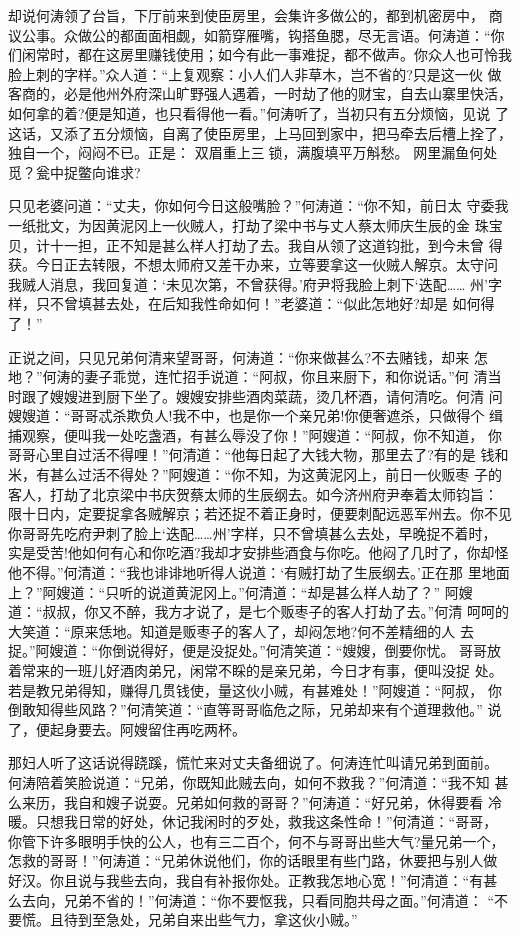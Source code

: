 却说何涛领了台旨，下厅前来到使臣房里，会集许多做公的，都到机密房中，
商议公事。众做公的都面面相觑，如箭穿雁嘴，钩搭鱼腮，尽无言语。何涛道：“你
们闲常时，都在这房里赚钱使用；如今有此一事难捉，都不做声。你众人也可怜我
脸上刺的字样。”众人道：“上复观察：小人们人非草木，岂不省的?只是这一伙
做客商的，必是他州外府深山旷野强人遇着，一时劫了他的财宝，自去山寨里快活，
如何拿的着?便是知道，也只看得他一看。”何涛听了，当初只有五分烦恼，见说
了这话，又添了五分烦恼，自离了使臣房里，上马回到家中，把马牵去后槽上拴了，
独自一个，闷闷不已。正是：
双眉重上三锁，满腹填平万斛愁。
网里漏鱼何处觅？瓮中捉鳖向谁求?

只见老婆问道：“丈夫，你如何今日这般嘴脸？”何涛道：“你不知，前日太
守委我一纸批文，为因黄泥冈上一伙贼人，打劫了梁中书与丈人蔡太师庆生辰的金
珠宝贝，计十一担，正不知是甚么样人打劫了去。我自从领了这道钧批，到今未曾
得获。今日正去转限，不想太师府又差干办来，立等要拿这一伙贼人解京。太守问
我贼人消息，我回复道：‘未见次第，不曾获得。’府尹将我脸上刺下‘迭配……
州’字样，只不曾填甚去处，在后知我性命如何！”老婆道：“似此怎地好?却是
如何得了！”

正说之间，只见兄弟何清来望哥哥，何涛道：“你来做甚么?不去赌钱，却来
怎地？”何涛的妻子乖觉，连忙招手说道：“阿叔，你且来厨下，和你说话。”何
清当时跟了嫂嫂进到厨下坐了。嫂嫂安排些酒肉菜蔬，烫几杯酒，请何清吃。何清
问嫂嫂道：“哥哥忒杀欺负人!我不中，也是你一个亲兄弟!你便奢遮杀，只做得个
缉捕观察，便叫我一处吃盏酒，有甚么辱没了你！”阿嫂道：“阿叔，你不知道，
你哥哥心里自过活不得哩！”何清道：“他每日起了大钱大物，那里去了?有的是
钱和米，有甚么过活不得处？”阿嫂道：“你不知，为这黄泥冈上，前日一伙贩枣
子的客人，打劫了北京梁中书庆贺蔡太师的生辰纲去。如今济州府尹奉着太师钧旨：
限十日内，定要捉拿各贼解京；若还捉不着正身时，便要刺配远恶军州去。你不见
你哥哥先吃府尹刺了脸上‘迭配……州’字样，只不曾填甚么去处，早晚捉不着时，
实是受苦!他如何有心和你吃酒?我却才安排些酒食与你吃。他闷了几时了，你却怪
他不得。”何清道：“我也诽诽地听得人说道：‘有贼打劫了生辰纲去。’正在那
里地面上？”阿嫂道：“只听的说道黄泥冈上。”何清道：“却是甚么样人劫了？”
阿嫂道：“叔叔，你又不醉，我方才说了，是七个贩枣子的客人打劫了去。”何清
呵呵的大笑道：“原来恁地。知道是贩枣子的客人了，却闷怎地?何不差精细的人
去捉。”阿嫂道：“你倒说得好，便是没捉处。”何清笑道：“嫂嫂，倒要你忧。
哥哥放着常来的一班儿好酒肉弟兄，闲常不睬的是亲兄弟，今日才有事，便叫没捉
处。若是教兄弟得知，赚得几贯钱使，量这伙小贼，有甚难处！”阿嫂道：“阿叔，
你倒敢知得些风路？”何清笑道：“直等哥哥临危之际，兄弟却来有个道理救他。”
说了，便起身要去。阿嫂留住再吃两杯。

那妇人听了这话说得跷蹊，慌忙来对丈夫备细说了。何涛连忙叫请兄弟到面前。
何涛陪着笑脸说道：“兄弟，你既知此贼去向，如何不救我？”何清道：“我不知
甚么来历，我自和嫂子说耍。兄弟如何救的哥哥？”何涛道：“好兄弟，休得要看
冷暖。只想我日常的好处，休记我闲时的歹处，救我这条性命！”何清道：“哥哥，
你管下许多眼明手快的公人，也有三二百个，何不与哥哥出些大气?量兄弟一个，
怎救的哥哥！”何涛道：“兄弟休说他们，你的话眼里有些门路，休要把与别人做
好汉。你且说与我些去向，我自有补报你处。正教我怎地心宽！”何清道：“有甚
么去向，兄弟不省的！”何涛道：“你不要怄我，只看同胞共母之面。”何清道：
“不要慌。且待到至急处，兄弟自来出些气力，拿这伙小贼。”

